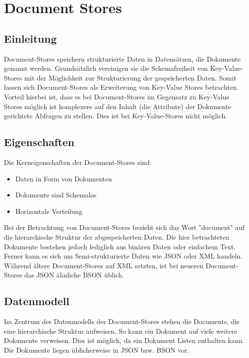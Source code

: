 \section{Document Stores}
\subsection{Einleitung}
Document-Stores speichern strukturierte Daten in Datensätzen, die Dokumente genannt werden. Grundsätzlich vereinigen sie die Schemafreiheit von Key-Value-Stores mit der Möglichkeit zur Strukturierung der gespeicherten Daten. Somit lassen sich Document-Stores als Erweiterung von Key-Value Stores betrachten. Vorteil hierbei ist, dass es bei Document-Stores im Gegensatz zu Key-Value Stores möglich ist komplexere auf den Inhalt (die Attribute) der Dokumente gerichtete Abfragen zu stellen. Dies ist bei Key-Value-Stores nicht möglich.

\subsection{Eigenschaften}
Die Kerneigenschaften der Document-Stores sind:
\begin{itemize}
\item Daten in Form von Dokumenten
\item Dokumente sind Schemalos
\item Horizontale Verteilung
\end{itemize}
Bei der Betrachtung von Document-Stores bezieht sich das Wort "document" auf die hierarchische Struktur der abgespeicherten Daten. Die hier betrachteten Dokumente bestehen jedoch lediglich aus binären Daten oder einfachem Text. Ferner kann es sich um Semi-strukturierte Daten wie JSON oder XML handeln. Während ältere Document-Stores auf XML setzten, ist bei neueren Document-Stores das JSON ähnliche BSON üblich. 


\subsection{Datenmodell}
Im Zentrum des Datenmodells der Document-Stores stehen die Documents, die eine hierarchische Struktur aufweisen. So kann ein Dokument auf viele weitere Dokumente verweisen. Dies ist möglich, da ein Dokument Listen enthalten kann. 
\\
Die Dokumente liegen üblicherweise in JSON bzw. BSON vor.

